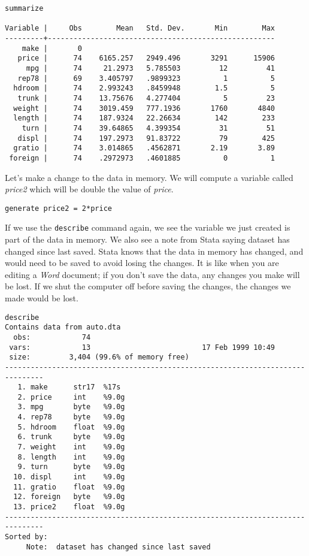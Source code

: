 \begin{lstlisting}
summarize

Variable |     Obs        Mean   Std. Dev.       Min        Max
---------+-----------------------------------------------------
    make |       0
   price |      74    6165.257   2949.496       3291      15906
     mpg |      74     21.2973   5.785503         12         41
   rep78 |      69    3.405797   .9899323          1          5
  hdroom |      74    2.993243   .8459948        1.5          5
   trunk |      74    13.75676   4.277404          5         23
  weight |      74    3019.459   777.1936       1760       4840
  length |      74    187.9324   22.26634        142        233
    turn |      74    39.64865   4.399354         31         51
   displ |      74    197.2973   91.83722         79        425
  gratio |      74    3.014865   .4562871       2.19       3.89
 foreign |      74    .2972973   .4601885          0          1
\end{lstlisting}

Let's make a change to the data in memory. We will compute a variable called \textit{price2} which will be double the value of \textit{price}.

\begin{lstlisting}
generate price2 = 2*price
\end{lstlisting}

If we use the \lstinline{describe} command again, we see the variable we just created is part of the data in memory. We also see a note from Stata saying dataset has changed since last saved. Stata knows that the data in memory has changed, and would need to be saved to avoid losing the changes. It is like when you are editing a \textit{Word} document; if you don't save the data, any changes you make will be lost. If we shut the computer off before saving the changes, the changes we made would be lost.

\begin{lstlisting}
describe
Contains data from auto.dta
  obs:            74
 vars:            13                          17 Feb 1999 10:49
 size:         3,404 (99.6% of memory free)
-------------------------------------------------------------------------------
   1. make      str17  %17s
   2. price     int    %9.0g
   3. mpg       byte   %9.0g
   4. rep78     byte   %9.0g
   5. hdroom    float  %9.0g
   6. trunk     byte   %9.0g
   7. weight    int    %9.0g
   8. length    int    %9.0g
   9. turn      byte   %9.0g
  10. displ     int    %9.0g
  11. gratio    float  %9.0g
  12. foreign   byte   %9.0g
  13. price2    float  %9.0g
-------------------------------------------------------------------------------
Sorted by:
     Note:  dataset has changed since last saved
\end{lstlisting}


